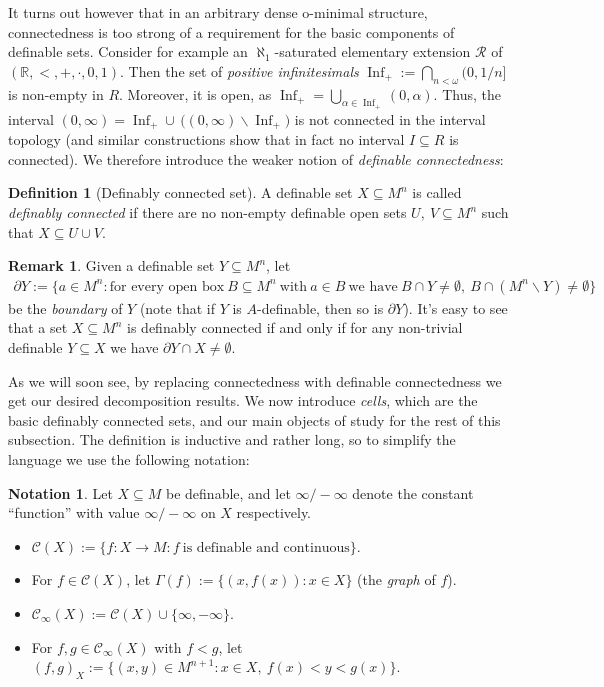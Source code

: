 \documentclass[a4paper]{report}
\newcommand{\ind}{\hspace{15pt}}
\newcommand{\R}{\mathbb{R}}
\newcommand{\C}{\mathcal{C}}
\newcommand{\Rns}{\mathcal{R}}
\DeclareMathOperator{\Inf}{Inf}
\theoremstyle{definition}
\newtheorem{defn}[thm]{Definition}
\theoremstyle{remstyle}
\newtheorem{rem}[thm]{Remark}
\newtheorem*{notation}{Notation}
\begin{document}
\ind It turns out however that in an arbitrary dense o-minimal structure, connectedness is too strong of a requirement for the basic components of definable sets. Consider for example an $\aleph_1$-saturated elementary extension $\Rns$ of $(\R,<,+,\cdot,0,1)$. Then the set of \emph{positive infinitesimals} $\Inf_+:=\bigcap_{n<\omega}(0,1/n]$ is non-empty in $R$. Moreover, it is open, as $\Inf_+=\bigcup_{\alpha\in\Inf_+}(0,\alpha)$. Thus, the interval $(0,\infty)=\Inf_+\cup\,\big((0,\infty)\backslash \Inf_+\big)$ is not connected in the interval topology (and similar constructions show that in fact no interval $I\subseteq R$ is connected). We therefore introduce the weaker notion of \emph{definable connectedness}:

\begin{defn}[Definably connected set]
	A definable set $X\subseteq M^n$ is called \emph{definably connected} if there are no non-empty definable open sets $U,\:V\subseteq M^n$ such that $X\subseteq U\cup V$.
\end{defn}

\begin{rem}\label{defconbound}
	Given a definable set $Y\subseteq M^n$, let
	\begin{align*}
		\partial Y:=\big\{a\in M^n:\text{for every open box}\ B\subseteq M^n\ \text{with}\ a\in B\ \text{we have}\ B\cap Y\neq \emptyset,\ B\cap (M^n\backslash Y)\neq \emptyset\big\}
	\end{align*}
	be the \emph{boundary} of $Y$ (note that if $Y$ is $A$-definable, then so is $\partial Y$). It's easy to see that a set $X\subseteq M^n$ is definably connected if and only if for any non-trivial definable $Y\subseteq X$ we have $\partial Y\cap X\neq\emptyset$.
\end{rem}

\ind As we will soon see, by replacing connectedness with definable connectedness we get our desired decomposition results. We now introduce \emph{cells}, which are the basic definably connected sets, and our main objects of study for the rest of this subsection. The definition is inductive and rather long, so to simplify the language we use the following notation:

\begin{notation}
	Let $X\subseteq M$ be definable, and let $\infty/-\infty$ denote the constant ``function'' with value $\infty/-\infty$ on $X$ respectively.
	\begin{itemize}
		\item $\C(X) :=\{f:X\to M : f\ \text{is definable and continuous}\}$.
		\item For $f\in \C(X)$, let $\Gamma(f):=\{(x,f(x)):x\in X\}$ (the \emph{graph} of $f$).
		\item $\C_{\infty}(X) := \C(X)\cup\{\infty,-\infty\}$.
		\item For $f,g\in \C_{\infty}(X)$ with $f<g$, let $(f,g)_X:=\{(x,y)\in M^{n+1}: x\in X,\: f(x) < y < g(x)\}$.
	\end{itemize}
\end{notation}
\end{document}
